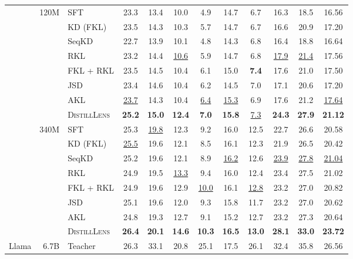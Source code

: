 \begin{table}[!t]
\begin{tabular}{lrl|cc|cc|cc|c|c||c}
     & \multirow{8}{*}{120M}
        & SFT &  23.3 & 13.4 & 10.0 & 4.9 & 14.7 & 6.7 & 16.3 & 18.5 & 16.56 \\
     &  & KD (FKL) &  23.5 & 14.3 & 10.3 & 5.7 & 14.7 & 6.7 & 16.6 & 20.9  & 17.20  \\
     &  & SeqKD &  22.7 & 13.9 & 10.1 & 4.8 & 14.3 & 6.8 & 16.4 & 18.8 & 16.64 \\
     & & RKL & 23.2 & 14.4 & \underline{10.6} & 5.9 & 14.7 & 6.8 & \underline{17.9} & \underline{21.4} & 17.56 \\
     & & FKL + RKL & 23.5 & 14.5 & 10.4 & 6.1 & 15.0 & \textbf{7.4} & 17.6 & 21.0 & 17.50 \\
     & & JSD & 23.4 & 14.6 & 10.4 & 6.2 & 14.5 & 7.0 & 17.1 & 20.6 & 17.20 \\
     & & AKL & \underline{23.7} & 14.3 & 10.4 & \underline{6.4} & \underline{15.3} & 6.9 & 17.6 &  21.2 & \underline{17.64} \\
     & & \textsc{DistillLens} & \textbf{25.2} & \textbf{15.0} & \textbf{12.4} & \textbf{7.0} & \textbf{15.8} & \underline{7.3} & \textbf{24.3} & \textbf{27.9} & \textbf{21.12} \\
     \cmidrule{2-12}
     & \multirow{8}{*}{340M}
        & SFT & 25.3 & \underline{19.8} & 12.3 & 9.2 & 16.0 & 12.5 & 22.7 & 26.6 & 20.58 \\
     &  & KD (FKL)  & \underline{25.5} & 19.6 & 12.1 & 8.5 & 16.1 & 12.3 & 21.9 & 26.5 & 20.42 \\
     &  & SeqKD & 25.2 & 19.6 & 12.1 & 8.9 & \underline{16.2} & 12.6 & \underline{23.9} & \underline{27.8} & \underline{21.04} \\
     & & RKL & 24.9 & 19.5 & \underline{13.3} & 9.4 & 16.0 & 12.4 & 23.4 & 27.5 & 21.02\\
     & & FKL + RKL & 24.9 & 19.6 & 12.9 & \underline{10.0} & 16.1 & \underline{12.8} & 23.2 & 27.0 & 20.82 \\
     & & JSD & 25.1 & 19.6 & 12.0 & 9.3 & 15.8 & 11.7 & 23.2 & 27.0 & 20.62 \\
     & & AKL & 24.8 & 19.3 & 12.7 & 9.1 & 15.2 & 12.7 & 23.2 &  27.3 & 20.64 \\
     & & \textsc{DistillLens} & \textbf{26.4} & \textbf{20.1} & \textbf{14.6} & \textbf{10.3} & \textbf{16.5} & \textbf{13.0} & \textbf{28.1} & \textbf{33.0} & \textbf{23.72} \\
    \midrule
    \multirow{9}{*}{Llama}
      & 6.7B & Teacher &  26.3 & 33.1 & 20.8 & 25.1 & 17.5 & 26.1 & 32.4 & 35.8 & 26.56    \\ 
      \cmidrule{2-12}

\end{tabular}
\end{table}

